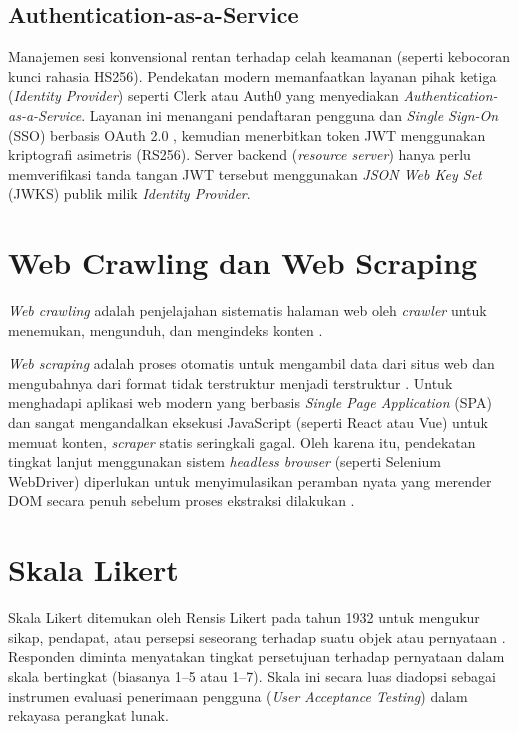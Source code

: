 \subsection{Authentication-as-a-Service}
Manajemen sesi konvensional rentan terhadap celah keamanan (seperti kebocoran kunci rahasia HS256). Pendekatan modern memanfaatkan
layanan pihak ketiga (\textit{Identity Provider}) seperti Clerk atau Auth0 yang menyediakan \textit{Authentication-as-a-Service}.
Layanan ini menangani pendaftaran pengguna dan \textit{Single Sign-On} (SSO) berbasis OAuth 2.0 \cite{Hardt2012}, kemudian menerbitkan token JWT \cite{Jones2015} menggunakan kriptografi
asimetris (RS256). Server backend (\textit{resource server}) hanya perlu memverifikasi tanda tangan JWT
tersebut menggunakan \textit{JSON Web Key Set} (JWKS) publik milik \textit{Identity Provider}.

\section{Web Crawling dan Web Scraping}
\textit{Web crawling} adalah penjelajahan sistematis halaman web oleh \textit{crawler}
untuk menemukan, mengunduh, dan mengindeks konten \cite{Khder2021}.

\textit{Web scraping} adalah proses otomatis untuk mengambil data dari situs web dan
mengubahnya dari format tidak terstruktur menjadi terstruktur \cite{Khder2021}.
Untuk menghadapi aplikasi web modern yang berbasis \textit{Single Page Application} (SPA) dan sangat
mengandalkan eksekusi JavaScript (seperti React atau Vue) untuk memuat konten, \textit{scraper} statis
seringkali gagal. Oleh karena itu, pendekatan tingkat lanjut menggunakan sistem \textit{headless browser}
(seperti Selenium WebDriver) diperlukan untuk menyimulasikan peramban nyata yang merender DOM secara
penuh sebelum proses ekstraksi dilakukan \cite{Garg2020}.

\section{Skala Likert}
Skala Likert ditemukan oleh Rensis Likert pada tahun 1932 untuk mengukur sikap,
pendapat, atau persepsi seseorang terhadap suatu objek atau pernyataan \cite{Simamora2022}.
Responden diminta menyatakan tingkat persetujuan terhadap pernyataan dalam skala
bertingkat (biasanya 1--5 atau 1--7). Skala ini secara luas diadopsi sebagai instrumen evaluasi
penerimaan pengguna (\textit{User Acceptance Testing}) dalam rekayasa perangkat lunak.

